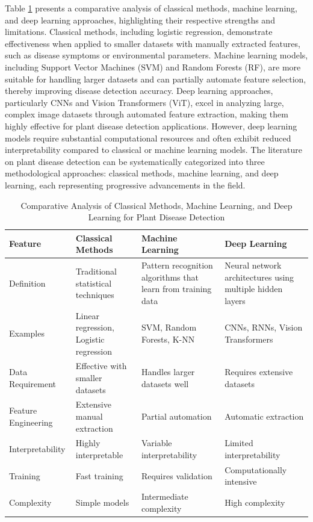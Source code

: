 \documentclass[sn-mathphys]{sn-jnl}
\theoremstyle{thmstyleone}%
\theoremstyle{thmstyletwo}%
\theoremstyle{thmstylethree}%
\begin{document}
Table \ref{tab:comparison} presents a comparative analysis of classical methods, machine learning, and deep learning approaches, highlighting their respective strengths and limitations. Classical methods, including logistic regression, demonstrate effectiveness when applied to smaller datasets with manually extracted features, such as disease symptoms or environmental parameters. Machine learning models, including Support Vector Machines (SVM) and Random Forests (RF), are more suitable for handling larger datasets and can partially automate feature selection, thereby improving disease detection accuracy. Deep learning approaches, particularly CNNs and Vision Transformers (ViT), excel in analyzing large, complex image datasets through automated feature extraction, making them highly effective for plant disease detection applications. However, deep learning models require substantial computational resources and often exhibit reduced interpretability compared to classical or machine learning models. The literature on plant disease detection can be systematically categorized into three methodological approaches: classical methods, machine learning, and deep learning, each representing progressive advancements in the field.


\begin{table}[h!]
\caption{Comparative Analysis of Classical Methods, Machine Learning, and Deep Learning for Plant Disease Detection}
\centering
\small
\label{tab:comparison}
\begin{tabular}{p{2.2cm}>{\raggedright}p{3.2cm}>{\raggedright}p{3.2cm}>{\raggedright}p{3.2cm}}
\hline
\textbf{Feature} & \textbf{Classical Methods} & \textbf{Machine Learning} & \textbf{Deep Learning} \\ 
\hline\hline
Definition & Traditional statistical techniques & Pattern recognition algorithms that learn from training data & Neural network architectures using multiple hidden layers \\ 
\hline
Examples & \raggedright Linear regression, Logistic regression & \raggedright SVM, Random Forests, K-NN & \raggedright CNNs, RNNs, Vision Transformers \\ 
\hline
Data Requirement & Effective with smaller datasets & Handles larger datasets well & Requires extensive datasets \\ 
\hline
Feature Engineering & Extensive manual extraction & Partial automation & Automatic extraction \\ 
\hline
Interpretability & Highly interpretable & Variable interpretability & Limited interpretability \\ 
\hline
Training & Fast training & Requires validation & Computationally intensive \\ 
\hline
Complexity & Simple models & Intermediate complexity & High complexity \\ 
\hline
\end{tabular}
\end{table}
\end{document}
